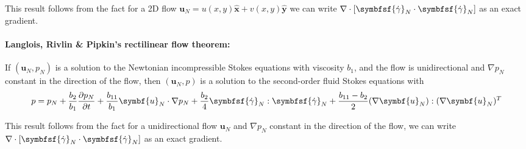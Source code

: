 \documentclass{jknotes}
\begin{document}
This result follows from the fact for a 2D flow $\symbf{u}_N = u(x,y)\hat{\symbf{x}} +
v(x,y) \hat{\symbf{y}}$ we can write $\nabla \cdot \left[ \symbfsf{\srate}_N
\cdot \symbfsf{\srate}_N\right]$ as an exact gradient.

\paragraph{Langlois, Rivlin \& Pipkin's rectilinear flow theorem:} If
$(\symbf{u}_N, p_N)$ is a solution to the Newtonian incompressible Stokes
equations with viscosity $b_1$, and the flow is unidirectional and $\nabla
p_N$ constant in the direction of the flow, then $(\symbf{u}_N, p)$ is a
solution to the second-order fluid Stokes equations with
\begin{equation}
	p = p_N + \frac{b_2}{b_1} \frac{\partial p_N}{\partial t} +
	\frac{b_{11}}{b_1} \symbf{u}_N \cdot \nabla p_N + \frac{b_2}{4}
	\symbfsf{\srate}_N : \symbfsf{\srate}_N + \frac{b_{11}-b_2}{2} (\nabla
	\symbf{u}_N) : (\nabla \symbf{u}_N)^T
\end{equation}

This result follows from the fact for a unidirectional flow $\symbf{u}_N$ and
$\nabla p_N$ constant in the direction of the flow, we can write $\nabla \cdot
\left[ \symbfsf{\srate}_N \cdot \symbfsf{\srate}_N\right]$ as an exact
gradient.

\end{document}
